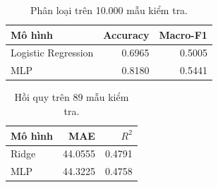 \begin{table}[htbp]\centering\caption{Phân loại trên 10.000 mẫu kiểm tra.}\begin{tabular}{lrr}\toprule Mô hình & Accuracy & Macro-F1\\\midrule
Logistic Regression & 0.6965 & 0.5005\\
MLP & 0.8180 & 0.5441\\\bottomrule\end{tabular}\end{table}
\begin{table}[htbp]\centering\caption{Hồi quy trên 89 mẫu kiểm tra.}\begin{tabular}{lrr}\toprule Mô hình & MAE & $R^2$\\\midrule
Ridge & 44.0555 & 0.4791\\
MLP & 44.3225 & 0.4758\\\bottomrule\end{tabular}\end{table}
